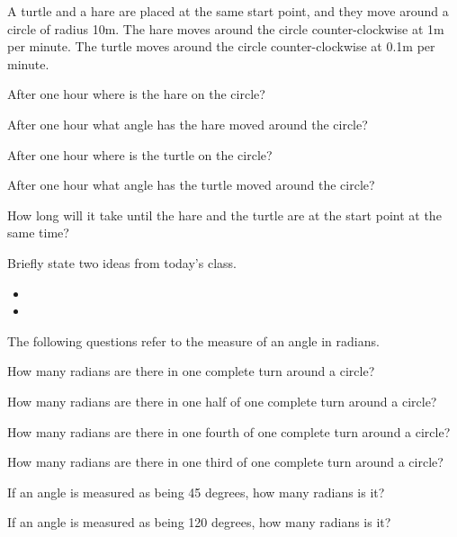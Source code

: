 \begin{problem}
\clearpage

\item A turtle and a hare are placed at the same start point, and they
  move around a circle of radius 10m. The hare moves around the circle
  counter-clockwise at 1m per minute. The turtle moves around the
  circle counter-clockwise at 0.1m per minute.
  \begin{subproblem}
  \item After one hour where is the hare on the circle?
    \vfill

  \item After one hour what angle has the hare moved around the circle?
    \vfill

  \item After one hour where is the turtle on the circle?
    \vfill

  \item After one hour what angle has the turtle moved around the circle?
    \vfill

  \item How long will it take until the hare and the turtle are at the
    start point at the same time?
    \vfill
  \end{subproblem}


\end{problem}

\postClass

\begin{problem}
\item Briefly state two ideas from today's class.
  \begin{itemize}
  \item
  \item
  \end{itemize}
\item The following questions refer to the measure of an angle in
  radians.
  \begin{subproblem}
  \item How many radians are there in one complete turn around a
    circle?
    \vfill
  \item How many radians are there in one half of one complete turn
    around a circle?
    \vfill
  \item How many radians are there in one fourth of one complete turn
    around a circle?
    \vfill
  \item How many radians are there in one third  of one complete turn
    around a circle?
    \vfill
  \item If an angle is measured as being 45 degrees, how many radians
    is it?
    \vfill
  \item If an angle is measured as being 120 degrees, how many radians
    is it?
    \vfill
  \end{subproblem}
\end{problem}


